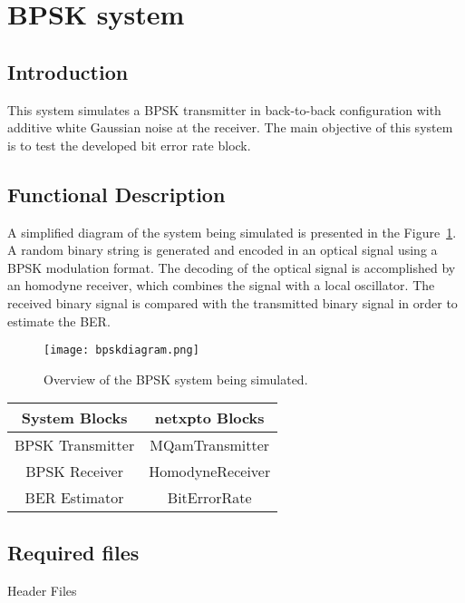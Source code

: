 \clearpage
\section{BPSK system}


\subsection*{Introduction}

This system simulates a BPSK transmitter in back-to-back configuration with additive white Gaussian noise at the receiver. The main objective of this system is to test the developed bit error rate block.


\subsection*{Functional Description}

A simplified diagram of the system being simulated is presented in the Figure~\ref{fig:homodynesystem}. A random binary string is generated and encoded in an optical signal using a BPSK modulation format. The decoding of the optical signal is accomplished by an homodyne receiver, which combines the signal with a local oscillator.
The received binary signal is compared with the transmitted binary signal in order to estimate the BER.

\begin{figure}[h]
\centering
\texttt{[image: bpskdiagram.png]}
\caption{Overview of the BPSK system being simulated.}
\label{fig:homodynesystem}
\end{figure}

\begin{table}[H]
\centering
\begin{tabular}{c|c}
System Blocks    & netxpto Blocks   \\ \hline
BPSK Transmitter & MQamTransmitter  \\
BPSK Receiver    & HomodyneReceiver \\
BER Estimator    & BitErrorRate
\end{tabular}
\end{table}

\subsection*{Required files}\label{Required files}

Header Files

